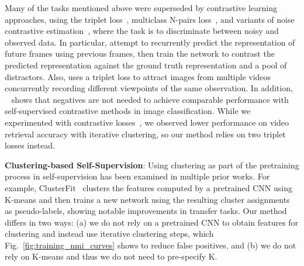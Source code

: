 \documentclass[10pt,twocolumn,letterpaper]{article}
\begin{document}
Many of the tasks mentioned above were superseded by contrastive learning approaches, using the triplet loss~\cite{Schroff_2015}, multiclass N-pairs loss~\cite{npairs}, and variants of noise contrastive estimation~\cite{pmlr-v9-gutmann10a, oord2019representation, SeCo2021, videoMoCo, CoCon2021, VideoDeepInfoMax, DPC}, where the task is to discriminate between noisy and observed data. In particular, \cite{CoCon2021, DPC} attempt to recurrently predict the representation of future frames using previous frames, then train the network to contrast the predicted representation against the ground truth representation and a pool of distractors. Also, \cite{TimeContrastiveNetworks} uses a triplet loss to attract images from multiple videos concurrently recording different viewpoints of the same observation. In addition, ~\cite{byol} shows that negatives are not needed to achieve comparable performance with self-supervised contrastive methods in image classification. While we experimented with contrastive losses~\cite{oord2019representation, coclr, chen2020simple, chen2020mocov2}, we observed lower performance on video retrieval accuracy with iterative clustering, so our method relies on two triplet losses instead.               

\textbf{Clustering-based Self-Supervision}: Using clustering as part of the pretraining process in self-supervision has been examined in multiple prior works. For example, ClusterFit~\cite{yan2019clusterfit} clusters the features computed by a pretrained CNN using K-means and then trains a new network using the resulting cluster assignments as pseudo-labels, showing notable improvements in transfer tasks. Our method differs in two ways: (a) we do not rely on a pretrained CNN to obtain features for clustering and instead use iterative clustering steps, which Fig.~\ref{fig:training_nmi_curves} shows to reduce false positives, and (b) we do not rely on K-means and thus we do not need to pre-specify K. 
\end{document}
